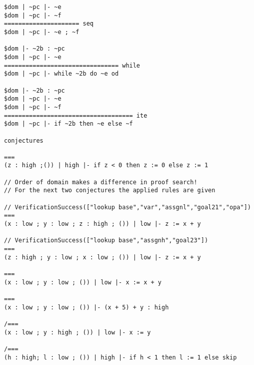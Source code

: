 \begin{lstlisting}[language=sltc]
$dom | ~pc |- ~e
$dom | ~pc |- ~f
===================== seq
$dom | ~pc |- ~e ; ~f

$dom |- ~2b : ~pc
$dom | ~pc |- ~e
================================ while
$dom | ~pc |- while ~2b do ~e od

$dom |- ~2b : ~pc
$dom | ~pc |- ~e
$dom | ~pc |- ~f
==================================== ite
$dom | ~pc |- if ~2b then ~e else ~f

conjectures

===
(z : high ;()) | high |- if z < 0 then z := 0 else z := 1

// Order of domain makes a difference in proof search!
// For the next two conjectures the applied rules are given

// VerificationSuccess(["lookup base","var","assgnl","goal21","opa"])
===
(x : low ; y : low ; z : high ; ()) | low |- z := x + y

// VerificationSuccess(["lookup base","assgnh","goal23"])
===
(z : high ; y : low ; x : low ; ()) | low |- z := x + y

===
(x : low ; y : low ; ()) | low |- x := x + y

===
(x : low ; y : low ; ()) |- (x + 5) + y : high

/===
(x : low ; y : high ; ()) | low |- x := y

/===
(h : high; l : low ; ()) | high |- if h < 1 then l := 1 else skip
\end{lstlisting}

